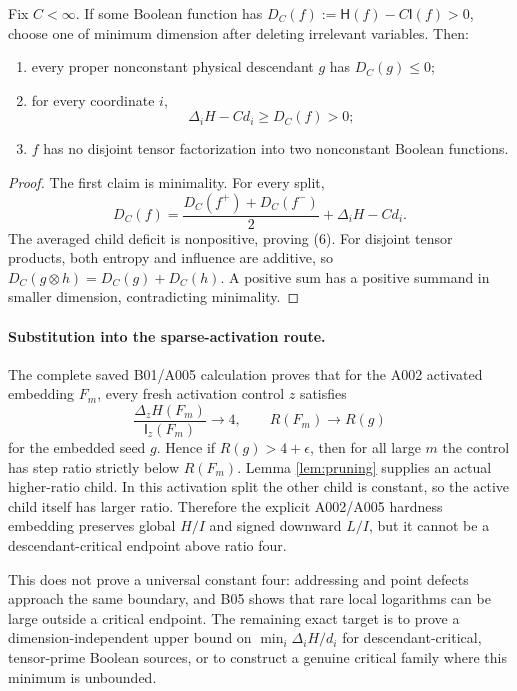 \begin{proposition}
Fix $C<\infty$.  If some Boolean function has
$D_C(f):=\mathsf H(f)-C\mathsf I(f)>0$, choose one of minimum dimension after
deleting irrelevant variables.  Then:
\begin{enumerate}
\item every proper nonconstant physical descendant $g$ has $D_C(g)\le0$;
\item for every coordinate $i$,
\[
 \boxed{\Delta_iH-Cd_i\ge D_C(f)>0;}                  \tag{6}
\]
\item $f$ has no disjoint tensor factorization into two nonconstant Boolean
functions.
\end{enumerate}
\end{proposition}

\begin{proof}
The first claim is minimality.  For every split,
\[
 D_C(f)=\frac{D_C(f^+)+D_C(f^-)}2+\Delta_iH-Cd_i.
\]
The averaged child deficit is nonpositive, proving (6).  For disjoint tensor
products, both entropy and influence are additive, so
$D_C(g\otimes h)=D_C(g)+D_C(h)$.  A positive sum has a positive summand in
smaller dimension, contradicting minimality.
\end{proof}

\paragraph{Substitution into the sparse-activation route.}
The complete saved B01/A005 calculation proves that for the A002 activated
embedding $F_m$, every fresh activation control $z$ satisfies
\[
 \frac{\Delta_zH(F_m)}{\mathsf I_z(F_m)}\longrightarrow4,
 \qquad
 R(F_m)\longrightarrow R(g)
\]
for the embedded seed $g$.  Hence if $R(g)>4+\epsilon$, then for all large
$m$ the control has step ratio strictly below $R(F_m)$.  Lemma
\ref{lem:pruning} supplies an actual higher-ratio child.  In this activation
split the other child is constant, so the active child itself has larger
ratio.  Therefore the explicit A002/A005 hardness embedding preserves global
$H/I$ and signed downward $L/I$, but it cannot be a descendant-critical
endpoint above ratio four.

This does not prove a universal constant four: addressing and point defects
approach the same boundary, and B05 shows that rare local logarithms can be
large outside a critical endpoint.  The remaining exact target is to prove a
dimension-independent upper bound on $\min_i\Delta_iH/d_i$ for
descendant-critical, tensor-prime Boolean sources, or to construct a genuine
critical family where this minimum is unbounded.
